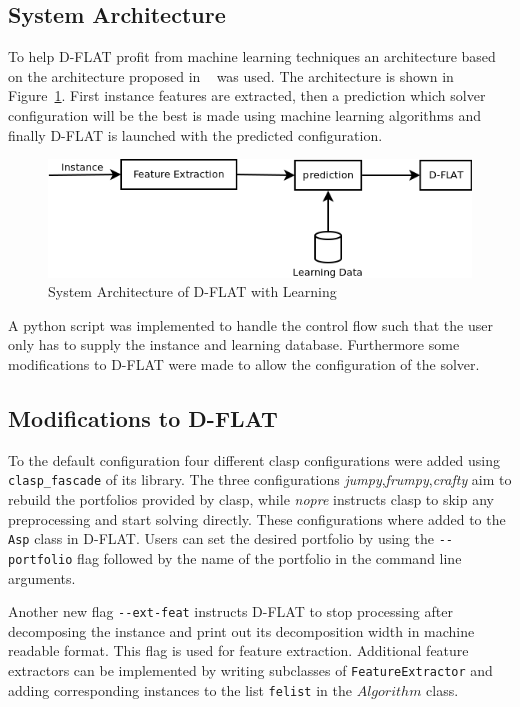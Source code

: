 \subsection{System Architecture}
To help D-FLAT profit from machine learning techniques an architecture based on the architecture proposed in ~\cite{DBLP:conf/lpnmr/GebserKKSSZ11} was used. The architecture is shown in Figure~\ref{impl:sysarch}. First instance features are extracted, then a prediction which solver configuration will be the best is made using machine learning algorithms and finally D-FLAT is launched with the predicted configuration.
\begin{figure}[h]
	\center
	\includegraphics[scale=0.6]{figures/sysarch.png}
	\caption{System Architecture of D-FLAT with Learning\label{impl:sysarch}}
\end{figure}
A python script was implemented to handle the control flow such that the user only has to supply the instance and learning database. Furthermore some modifications to D-FLAT were made to allow the configuration of the solver.

\subsection{Modifications to D-FLAT}
To the default configuration four different clasp configurations were added using \lstinline$clasp_fascade$ of its library. The three configurations \emph{jumpy},\emph{frumpy},\emph{crafty} aim to rebuild the portfolios provided by clasp, while \emph{nopre} instructs clasp to skip any preprocessing and start solving directly. These configurations where added to the \lstinline$Asp$ class in D-FLAT. Users can set the desired portfolio by using the \lstinline$--portfolio$ flag followed by the name of the portfolio in the command line arguments.

Another new flag \lstinline$--ext-feat$ instructs D-FLAT to stop processing after decomposing the instance and print out its decomposition width in machine readable format. This flag is used for feature extraction. Additional feature extractors can be implemented by writing subclasses of \lstinline$FeatureExtractor$ and adding corresponding instances to the list \lstinline$felist$ in the $Algorithm$ class.

